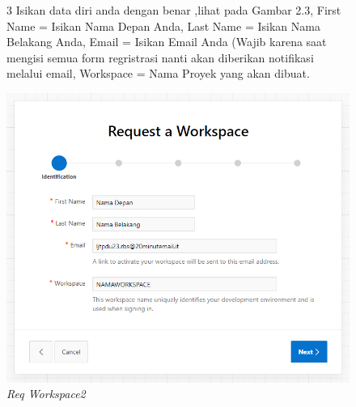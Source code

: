 \begin{itemize}
        \begin{figure}[!htbp]
        \item[3]Isikan data diri anda dengan benar ,lihat pada Gambar 2.3, First Name = Isikan Nama Depan Anda, Last Name = Isikan Nama Belakang Anda, Email = Isikan Email Anda (Wajib karena saat mengisi semua form regristrasi nanti akan diberikan notifikasi melalui email, Workspace = Nama Proyek yang akan dibuat.
        \begin{center}
        \includegraphics[scale=0.5]{figures/3.png}
        \caption{\textit{Req Workspace2}}
        \end{center}
        \end{figure}
        

\end{itemize}
